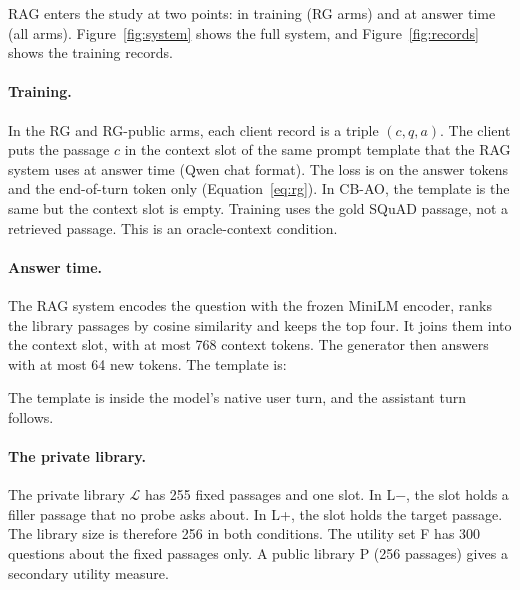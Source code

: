 \documentclass[11pt]{article}
\begin{document}
RAG enters the study at two points: in training (RG arms) and at answer time (all arms). Figure~\ref{fig:system} shows the full system, and Figure~\ref{fig:records} shows the training records.

\paragraph{Training.} In the RG and RG-public arms, each client record is a triple $(c,q,a)$. The client puts the passage $c$ in the context slot of the same prompt template that the RAG system uses at answer time (Qwen chat format). The loss is on the answer tokens and the end-of-turn token only (Equation~\eqref{eq:rg}). In CB-AO, the template is the same but the context slot is empty. Training uses the gold SQuAD passage, not a retrieved passage. This is an oracle-context condition.

\paragraph{Answer time.} The RAG system encodes the question with the frozen MiniLM encoder, ranks the library passages by cosine similarity and keeps the top four. It joins them into the context slot, with at most 768 context tokens. The generator then answers with at most 64 new tokens. The template is:
\begin{center}
\end{center}
The template is inside the model's native user turn, and the assistant turn follows.

\paragraph{The private library.} The private library $\mathcal L$ has 255 fixed passages and one slot. In L$-$, the slot holds a filler passage that no probe asks about. In L+, the slot holds the target passage. The library size is therefore 256 in both conditions. The utility set F has 300 questions about the fixed passages only. A public library P (256 passages) gives a secondary utility measure.
\end{document}
